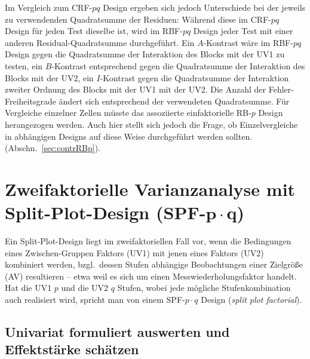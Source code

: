 Im Vergleich zum CRF-$pq$ Design ergeben sich jedoch Unterschiede bei der jeweils zu verwendenden Quadratsumme der Residuen: Während diese im CRF-$pq$ Design für jeden Test dieselbe ist, wird im RBF-$pq$ Design jeder Test mit einer anderen Residual-Quadratsumme durchgeführt. Ein $A$-Kontrast wäre im RBF-$pq$ Design gegen die Quadratsumme der Interaktion des Blocks mit der UV1 zu testen, ein $B$-Kontrast entsprechend gegen die Quadratsumme der Interaktion des Blocks mit der UV2, ein $I$-Kontrast gegen die Quadratsumme der Interaktion zweiter Ordnung des Blocks mit der UV1 mit der UV2. Die Anzahl der Fehler-Freiheitsgrade ändert sich entsprechend der verwendeten Quadratsumme. Für Vergleiche einzelner Zellen müsste das assoziierte einfaktorielle RB-$p$ Design herangezogen werden. Auch hier stellt sich jedoch die Frage, ob Einzelvergleiche in abhängigen Designs auf diese Weise durchgeführt werden sollten. (Abschn.\ \ref{sec:contrRBp}).

\section[Zweifaktorielle Varianzanalyse mit Split-Plot-Design (SPF-\texorpdfstring{$p \cdot q$}{p.q})]{Zweifaktorielle Varianzanalyse mit Split-Plot-Design (SPF-$\bm{p \cdot q}$)}
\label{sec:SPFpq}

Ein Split-Plot-Design liegt im zweifaktoriellen Fall vor, wenn die Bedingungen eines Zwischen-Gruppen Faktors (UV1) mit jenen eines Faktors (UV2) kombiniert werden, bzgl.\ dessen Stufen abhängige Beobachtungen einer Zielgröße (AV) resultieren -- etwa weil es sich um einen Messwiederholungsfaktor handelt. Hat die UV1 $p$ und die UV2 $q$ Stufen, wobei jede mögliche Stufenkombination auch realisiert wird, spricht man von einem SPF-$p \cdot q$ Design (\emph{split plot factorial}).

\subsection{Univariat formuliert auswerten und Effektstärke schätzen}

